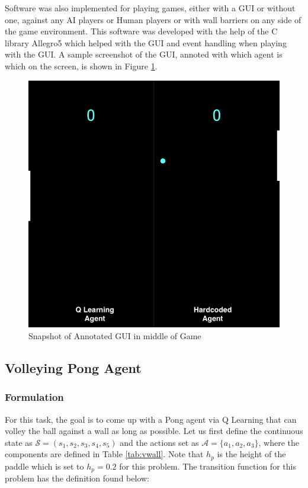 \documentclass{article}[12pt]
\begin{document}
   Software was also implemented for playing games, either with a GUI or without one, against any AI players or Human players or with wall barriers on any side of the game environment. This software was developed with the help of the C library Allegro5 which helped with the GUI and event handling when playing with the GUI. A sample screenshot of the GUI, annoted with which agent is which on the screen, is shown in Figure \ref{fig:gui1}.
   
   \begin{figure}[!htb]
   	\centering
   	\includegraphics[scale=0.7]{gui_snapshot2.png}
   	\caption{Snapshot of Annotated GUI in middle of Game}
   	\label{fig:gui1}
   \end{figure}
   
   \subsection{Volleying Pong Agent}
   \subsubsection{Formulation}
   For this task, the goal is to come up with a Pong agent via Q Learning that can volley the ball against a wall as long as possible. Let us first define the continuous state as $\mathcal{S} = \left( s_1, s_2, s_3, s_4, s_5\right)$ and the actions set as $\mathcal{A} = \lbrace a_1, a_2, a_3\rbrace $, where the components are defined in Table \ref{tab:vwall}. Note that $h_p$ is the height of the paddle which is set to $h_p = 0.2$ for this problem. The transition function for this problem has the definition found below:
   
\end{document}
